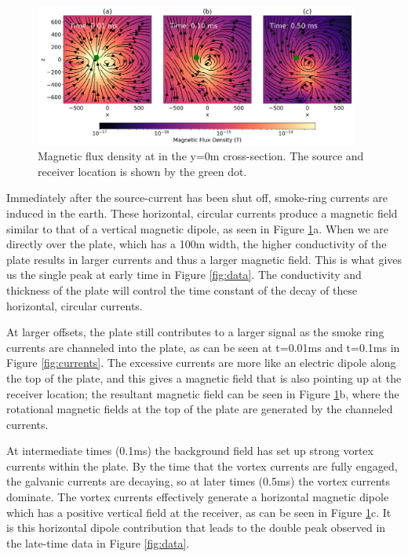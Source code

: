 \documentclass[paper]{geophysics}
\begin{document}
\begin{figure}[!htb]
  \centering
  \includegraphics[width=0.95\textwidth]{figures/magnetic_flux.png}
  \caption{Magnetic flux density at in the y=0m cross-section. The source and receiver location is shown by the green dot.}
  \label{fig:magnetic_flux}
\end{figure}


Immediately after the source-current has been shut off, smoke-ring currents are induced in the earth. These horizontal, circular currents produce a magnetic field similar to that of a vertical magnetic dipole, as seen in Figure \ref{fig:magnetic_flux}a. When we are directly over the plate, which has a 100m width, the higher conductivity of the plate results in larger currents and thus a larger magnetic field. This is what gives us the single peak at early time in Figure \ref{fig:data}. The conductivity and thickness of the plate will control the time constant of the decay of these horizontal, circular currents.

At larger offsets, the plate still contributes to a larger signal as the smoke ring currents are channeled into the plate, as can be seen at t=0.01ms and t=0.1ms in Figure \ref{fig:currents}. The excessive currents are more like an electric dipole along the top of the plate, and this gives a magnetic field that is also pointing up at the receiver location; the resultant magnetic field can be seen in Figure \ref{fig:magnetic_flux}b, where the rotational magnetic fields at the top of the plate are generated by the channeled currents.

At intermediate times (0.1ms) the background field has set up strong vortex currents within the plate. By the time that the vortex currents are fully engaged, the galvanic currents are decaying, so at later times (0.5ms) the vortex currents dominate. The vortex currents effectively generate a horizontal magnetic dipole which has a positive vertical field at the receiver, as can be seen in Figure \ref{fig:magnetic_flux}c. It is this horizontal dipole contribution that leads to the double peak observed in the late-time data in Figure \ref{fig:data}.
\end{document}
